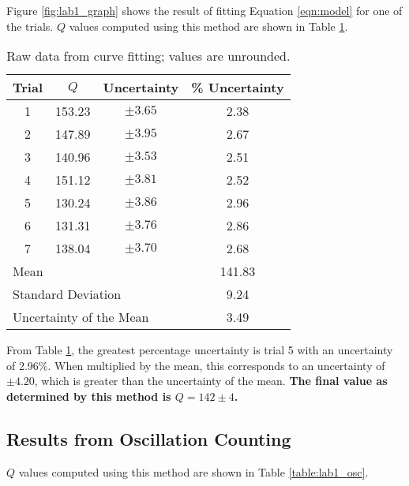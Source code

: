 \documentclass[aps,twocolumn,secnumarabic,nobalancelastpage,amsmath,amssymb,nofootinbib,floatfix,letterpaper]{revtex4}
\begin{document}
Figure \ref{fig:lab1_graph} shows the result of fitting Equation \ref{eqn:model} for one of the trials.
\(Q\) values computed using this method are shown in Table \ref{table:lab1_fit}.

\begin{table}[ht]
    \begin{tabular}{c|c|c|c}
        Trial & \(Q\) & Uncertainty & \% Uncertainty \\
        \hline
        1   & 153.23    & \(\pm 3.65\) & 2.38 \\
        2   & 147.89    & \(\pm 3.95\) & 2.67 \\
        3	& 140.96	& \(\pm 3.53\) & 2.51 \\
        4	& 151.12	& \(\pm 3.81\) & 2.52 \\
        5	& 130.24	& \(\pm 3.86\) & 2.96 \\
        6	& 131.31	& \(\pm 3.76\) & 2.86 \\
        7	& 138.04	& \(\pm 3.70\) & 2.68 \\
        \hline
        \multicolumn{3}{l}{Mean} & 141.83 \\
        \multicolumn{3}{l}{Standard Deviation} & 9.24 \\
        \multicolumn{3}{l}{Uncertainty of the Mean} & 3.49
    \end{tabular}
    \caption{Raw data from curve fitting; values are unrounded.}
    \label{table:lab1_fit}
\end{table}

From Table \ref{table:lab1_fit}, the greatest percentage uncertainty is trial 5 with an uncertainty of 2.96\%. When
multiplied by the mean, this corresponds to an uncertainty of \(\pm 4.20\), which is greater than the uncertainty of
the mean. \textbf{The final value as determined by this method is \(Q = 142 \pm 4\).}

\subsection{Results from Oscillation Counting}

\(Q\) values computed using this method are shown in Table \ref{table:lab1_osc}.
\end{document}
